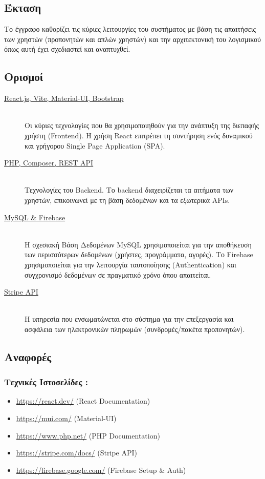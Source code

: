 \documentclass[12pt,a4paper]{report}
\begin{document}
\subsection{Έκταση}
Το έγγραφο καθορίζει τις κύριες λειτουργίες του συστήματος με βάση τις απαιτήσεις των χρηστών (προπονητών και απλών χρηστών) και την αρχιτεκτονική του λογισμικού όπως αυτή έχει σχεδιαστεί και αναπτυχθεί.

\subsection{Ορισμοί}
\begin{description}
    \item[\underline{React.js, Vite, Material-UI, Bootstrap}] \hfill \\
    Οι κύριες τεχνολογίες που θα χρησιμοποιηθούν για την ανάπτυξη της διεπαφής χρήστη (Frontend). Η χρήση React επιτρέπει τη συντήρηση ενός δυναμικού και γρήγορου Single Page Application (SPA).
    
    \item[\underline{PHP, Composer, REST API}] \hfill \\
    Τεχνολογίες του Backend. Το backend διαχειρίζεται τα αιτήματα των χρηστών, επικοινωνεί με τη βάση δεδομένων και τα εξωτερικά APIs.
    
    \item[\underline{MySQL \& Firebase}] \hfill \\
    Η σχεσιακή Βάση Δεδομένων MySQL χρησιμοποιείται για την αποθήκευση των περισσότερων δεδομένων (χρήστες, προγράμματα, αγορές). Το Firebase χρησιμοποιείται για την λειτουργία ταυτοποίησης (Authentication) και συγχρονισμό δεδομένων σε πραγματικό χρόνο όπου απαιτείται.
    
    \item[\underline{Stripe API}] \hfill \\
    Η υπηρεσία που ενσωματώνεται στο σύστημα για την επεξεργασία και ασφάλεια των ηλεκτρονικών πληρωμών (συνδρομές/πακέτα προπονητών).
\end{description}

\subsection{Αναφορές}

\subsubsection{Τεχνικές Ιστοσελίδες :}
\begin{itemize}[label=•]
    \item \url{https://react.dev/} (React Documentation)
    \item \url{https://mui.com/} (Material-UI)
    \item \url{https://www.php.net/} (PHP Documentation)
    \item \url{https://stripe.com/docs/} (Stripe API)
    \item \url{https://firebase.google.com/} (Firebase Setup \& Auth)
\end{itemize}
\end{document}
